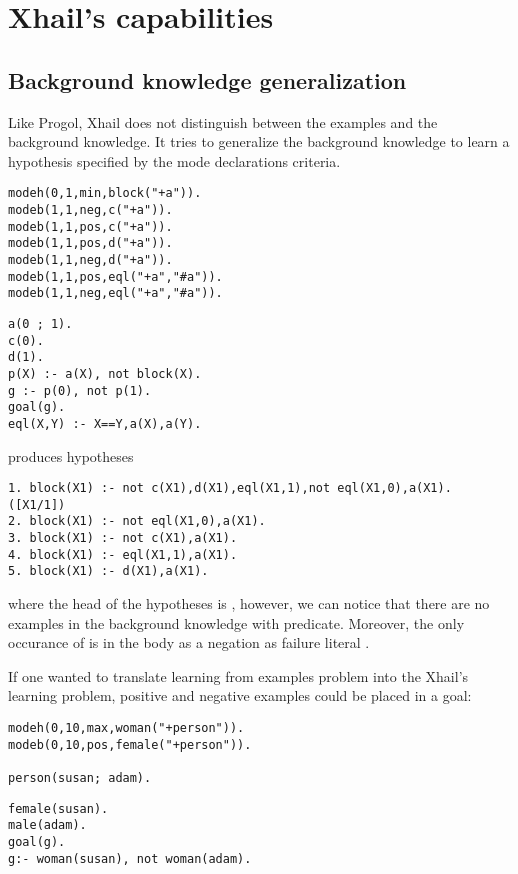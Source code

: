 \section{Xhail's capabilities}

\subsection{Background knowledge generalization}
Like Progol, Xhail does not distinguish between the examples and the background knowledge. It tries to generalize the background knowledge to learn a hypothesis specified by the mode declarations criteria.

\begin{minipage}[t]{.50\textwidth}
\begin{lstlisting}
modeh(0,1,min,block("+a")).
modeb(1,1,neg,c("+a")).
modeb(1,1,pos,c("+a")).
modeb(1,1,pos,d("+a")).
modeb(1,1,neg,d("+a")).
modeb(1,1,pos,eql("+a","#a")).
modeb(1,1,neg,eql("+a","#a")).
\end{lstlisting}
\end{minipage}
\begin{minipage}[t]{.20\textwidth}
\begin{lstlisting}
a(0 ; 1).
c(0).
d(1).
p(X) :- a(X), not block(X).
g :- p(0), not p(1).
goal(g).
eql(X,Y) :- X==Y,a(X),a(Y).
\end{lstlisting}
\end{minipage}

produces hypotheses
\begin{lstlisting}
1. block(X1) :- not c(X1),d(X1),eql(X1,1),not eql(X1,0),a(X1). ([X1/1])
2. block(X1) :- not eql(X1,0),a(X1).
3. block(X1) :- not c(X1),a(X1).
4. block(X1) :- eql(X1,1),a(X1).
5. block(X1) :- d(X1),a(X1).
\end{lstlisting}
where the head of the hypotheses is , however, we can notice that there are no examples in the background knowledge with  predicate. Moreover, the only occurance of  is in the body as a negation as failure literal .

If one wanted to translate learning from examples problem into the Xhail's learning problem, positive and negative examples could be placed in a goal:

\begin{minipage}[t]{.50\textwidth}
\begin{lstlisting}
modeh(0,10,max,woman("+person")).
modeb(0,10,pos,female("+person")).

person(susan; adam).
\end{lstlisting}
\end{minipage}
\begin{minipage}[t]{.20\textwidth}
\begin{lstlisting}
female(susan).
male(adam).
goal(g).
g:- woman(susan), not woman(adam).
\end{lstlisting}
\end{minipage}

